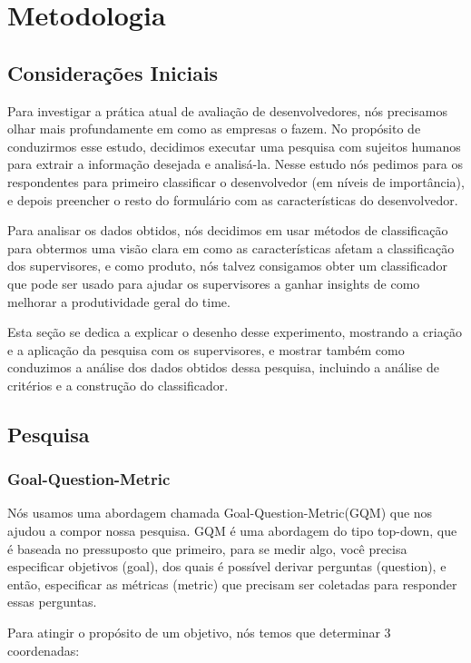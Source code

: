 \chapter[Metodolodia]{Metodologia}

\section{Considerações Iniciais}
Para investigar a prática atual de avaliação de desenvolvedores, nós precisamos olhar mais profundamente em como as empresas o fazem. No propósito de conduzirmos esse estudo, decidimos executar uma pesquisa com sujeitos humanos para extrair a informação desejada e analisá-la. Nesse estudo nós pedimos para os respondentes para primeiro classificar o desenvolvedor (em níveis de importância), e depois preencher o resto do formulário com as características do desenvolvedor.

Para analisar os dados obtidos, nós decidimos em usar métodos de classificação para obtermos uma visão clara em como as características afetam a classificação dos supervisores, e como produto, nós talvez consigamos obter um classificador que pode ser usado para ajudar os supervisores a ganhar insights de como melhorar a produtividade geral do time.

Esta seção se dedica a explicar o desenho desse experimento, mostrando a criação e a aplicação da pesquisa com os supervisores, e mostrar também como conduzimos a análise dos dados obtidos dessa pesquisa, incluindo a análise de critérios e a construção do classificador.

\section{Pesquisa}\label{secao3.2}

\subsection{Goal-Question-Metric}\label{secao3.2.1}
Nós usamos uma abordagem chamada Goal-Question-Metric(GQM) \cite{Basili1994} que nos ajudou a compor nossa pesquisa. GQM é uma abordagem do tipo top-down, que é baseada no pressuposto que primeiro, para se medir algo, você precisa especificar objetivos (goal), dos quais é possível derivar perguntas (question), e então, especificar as métricas (metric) que precisam ser coletadas para responder essas perguntas.

Para atingir o propósito de um objetivo, nós temos que determinar 3 coordenadas:

